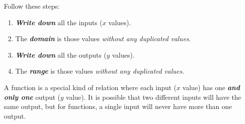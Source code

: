 \documentclass[fleqn,letterpaper,12pt,printwatermark=false]{memoir}
\begin{document}
\begin{myKeyConcepts}
    Follow these steps:
    \begin{enumerate}
        \item {\bfseries\itshape Write down} all the inputs ($x$ values).
        \item The {\bfseries\itshape domain} is those values \emph{without any duplicated values}.
        \item {\bfseries\itshape Write down} all the outputs ($y$ values).
        \item The {\bfseries\itshape range} is those values \emph{without any duplicated values}.
    \end{enumerate}
\end{myKeyConcepts}



\begin{myLesson}[][2]
    A function is a special kind of relation
    where each input ($x$ value) has one {\bfseries\itshape and only one} output ($y$ value).
    It is possible that two different inputs will have the same output,
    but for functions,
    a single input will never have more than one output.
\end{myLesson}
\end{document}
